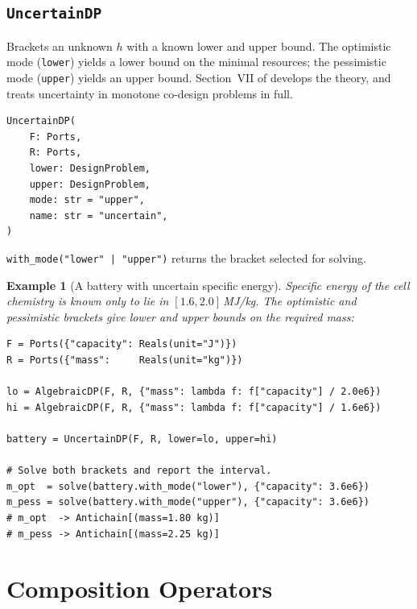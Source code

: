 \documentclass[11pt,a4paper]{article}
\newtheorem{example}[definition]{Example}
\begin{document}
\subsection{\texttt{UncertainDP}}

Brackets an unknown $h$ with a known lower and upper bound. The
optimistic mode (\texttt{lower}) yields a lower bound on the minimal
resources; the pessimistic mode (\texttt{upper}) yields an upper
bound. Section~VII of \citet{censi2015mathematical} develops the theory,
and \citet{censi2017uncertainty} treats uncertainty in monotone co-design
problems in full.

\begin{lstlisting}
UncertainDP(
    F: Ports,
    R: Ports,
    lower: DesignProblem,
    upper: DesignProblem,
    mode: str = "upper",
    name: str = "uncertain",
)
\end{lstlisting}

\texttt{with\_mode("lower" | "upper")} returns the bracket selected
for solving.

\begin{example}[A battery with uncertain specific energy]
Specific energy of the cell chemistry is known only to lie in
$[1.6, 2.0]$\,MJ/kg. The optimistic and pessimistic brackets give
lower and upper bounds on the required mass:
\begin{lstlisting}
F = Ports({"capacity": Reals(unit="J")})
R = Ports({"mass":     Reals(unit="kg")})

lo = AlgebraicDP(F, R, {"mass": lambda f: f["capacity"] / 2.0e6})
hi = AlgebraicDP(F, R, {"mass": lambda f: f["capacity"] / 1.6e6})

battery = UncertainDP(F, R, lower=lo, upper=hi)

# Solve both brackets and report the interval.
m_opt  = solve(battery.with_mode("lower"), {"capacity": 3.6e6})
m_pess = solve(battery.with_mode("upper"), {"capacity": 3.6e6})
# m_opt  -> Antichain[(mass=1.80 kg)]
# m_pess -> Antichain[(mass=2.25 kg)]
\end{lstlisting}
\end{example}

\section{Composition Operators}
\label{sec:composition}
\end{document}
